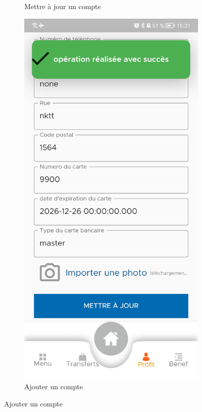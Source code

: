 \begin{itemize}[label=$\ast$]
\begin{figure}
\begin{subfigure}[b]{0.3\textwidth}
		\caption{Mettre à jour un compte}
		\label{fig:five over x}
	\end{subfigure}
	\newline
	\centering
	\begin{subfigure}{0.3\textwidth}
		\includegraphics[width=\hsize, valign=m ]{./Template LaTeX/Images/9.jpg}
		\caption{Ajouter un compte}
		\label{fig.SICAPI}
	\end{subfigure}
	

\end{figure}
\end{itemize}
